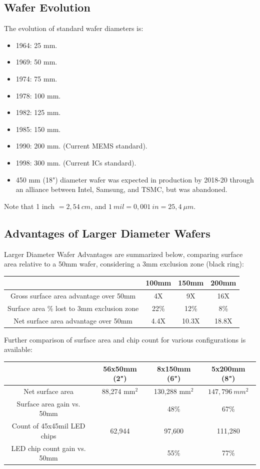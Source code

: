 \documentclass{report}
\begin{document}
\subsection{Wafer Evolution}
The evolution of standard wafer diameters is:
\begin{itemize}
    \item 1964: 25 mm.
    \item 1969: 50 mm.
    \item 1974: 75 mm.
    \item 1978: 100 mm.
    \item 1982: 125 mm.
    \item 1985: 150 mm.
    \item 1990: 200 mm. (Current MEMS standard).
    \item 1998: 300 mm. (Current ICs standard).
    \item 450 mm (18") diameter wafer was expected in production by 2018-20 through an alliance between Intel, Samsung, and TSMC, but was abandoned.
\end{itemize}
Note that 1 inch $= 2,54~cm$, and $1~mil=0,001~in=25,4~\mu m$.

\subsection{Advantages of Larger Diameter Wafers}
Larger Diameter Wafer Advantages are summarized below, comparing surface area relative to a 50mm wafer, considering a 3mm exclusion zone (black ring):
\begin{center}
\begin{tabular}{|c|c|c|c|}
\hline
& 100mm & 150mm & 200mm \\
\hline
Gross surface area advantage over 50mm & 4X & 9X & 16X \\
\hline
Surface area \% lost to 3mm exclusion zone & 22\% & 12\% & 8\% \\
\hline
Net surface area advantage over 50mm & 4.4X & 10.3X & 18.8X \\
\hline
\end{tabular}
\end{center}

Further comparison of surface area and chip count for various configurations is available:
\begin{center}
\begin{tabular}{|c|c|c|c|}
\hline
& 56x50mm (2") & 8x150mm (6") & 5x200mm (8") \\
\hline
Net surface area & 88,274 mm$^2$ & 130,288 mm$^2$ & $147,796~mm^{2}$ \\
\hline
Surface area gain vs. 50mm & & 48\% & 67\% \\
\hline
Count of 45x45mil LED chips & 62,944 & 97,600 & 111,280 \\
\hline
LED chip count gain vs. 50mm & & 55\% & 77\% \\
\hline
\end{tabular}
\end{center}
\end{document}
